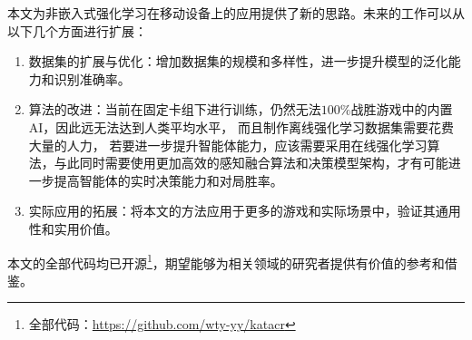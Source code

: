 本文为非嵌入式强化学习在移动设备上的应用提供了新的思路。未来的工作可以从以下几个方面进行扩展：
\begin{enumerate}
  \item 数据集的扩展与优化：增加数据集的规模和多样性，进一步提升模型的泛化能力和识别准确率。
  \item 算法的改进：当前在固定卡组下进行训练，仍然无法$100\%$战胜游戏中的内置AI，因此远无法达到人类平均水平，
  而且制作离线强化学习数据集需要花费大量的人力，
  若要进一步提升智能体能力，应该需要采用在线强化学习算法，与此同时需要使用更加高效的感知融合算法和决策模型架构，才有可能进一步提高智能体的实时决策能力和对局胜率。
  \item 实际应用的拓展：将本文的方法应用于更多的游戏和实际场景中，验证其通用性和实用价值。
\end{enumerate}

本文的全部代码均已开源\footnote{全部代码：\url{https://github.com/wty-yy/katacr}}，期望能够为相关领域的研究者提供有价值的参考和借鉴。